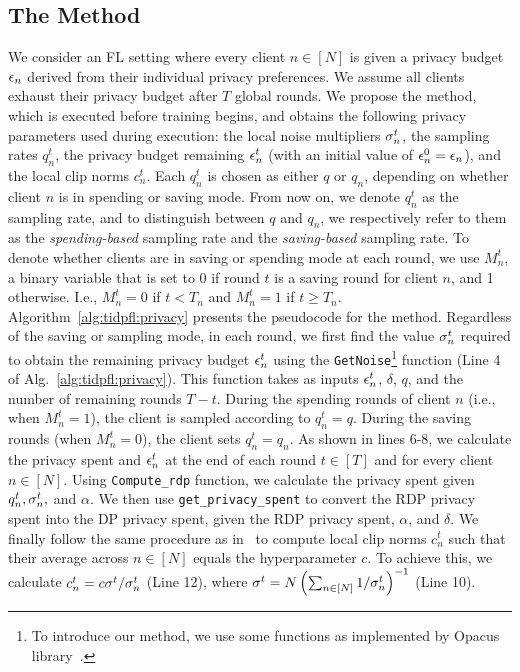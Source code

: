 \subsection{The \algasgo Method}\label{sec:proposed:alg:privacy}
{We consider an FL setting where every client $n\in [N]$ is given a privacy budget ${\epsilon}_n$ derived from their individual privacy preferences. We assume all clients exhaust their privacy budget after $T$ global rounds. We propose the \algasgo method, which is executed before training begins, and obtains the following privacy parameters used during execution: 
the local noise multipliers $\sigma_n^t$, the sampling rates $q_n^t$, the privacy budget remaining ${\epsilon}_n^t$ (with an initial value of ${\epsilon}_n^0={\epsilon}_n$), and the local clip norms $c_n^t$. Each $q_n^t$ is chosen as either $q$ or $q_n$, depending on whether client $n$ is in spending or saving mode. From now on, we denote $q_n^t$ as the sampling rate, and to distinguish between $q$ and $q_n$, we respectively refer to them as the {\em spending-based} sampling rate and the {\em saving-based} sampling rate. To denote whether clients are in saving or spending mode at each round, we use $M_n^t$, a binary variable that is set to 0 if round $t$ is a saving round for client $n$, and 1 otherwise. I.e., $M_n^t = 0$ if $t< T_n$ and $M_n^t = 1$ if $t\geq T_n$. }
{Algorithm~\ref{alg:tidpfl:privacy} presents the pseudocode for the \algasgo method.  Regardless of the saving or sampling mode, in each round, we first find the value $\sigma_n^t$ required to obtain the remaining privacy budget ${\epsilon}_n^t$ using the \texttt{GetNoise}\footnote{To introduce our \algasgo method, we use some functions as implemented by Opacus library~\citep{opacus}.} function (Line 4 of Alg.~\ref{alg:tidpfl:privacy}). This function takes as inputs ${\epsilon}_n^t$, $\delta$, $q$, and the number of remaining rounds $T-t$. During the spending rounds of client $n$ (i.e., when $M_n^t=1$), the client is sampled according to $q_n^t=q$. During the saving rounds (when $M_n^t=0$), the client sets $q_n^t=q_n$. As shown in lines 6-8, we calculate the privacy spent and ${\epsilon}_n^t$ at the end of each round $t\in [T]$ and for every client $n\in [N]$. Using  \texttt{Compute\_rdp} function, we calculate the privacy spent given $q_n^t, \sigma_n^t,$ and $\alpha$. We then use \texttt{get\_privacy\_spent} to convert the RDP privacy spent into the DP privacy spent, given the RDP privacy spent, $\alpha$, and $\delta$. We finally follow the same procedure as in~\citet{boenisch2024have} to compute local clip norms $c_n^t$ such that their average across $n\in [N]$ equals the hyperparameter $c$. To achieve this, we calculate $c_n^t={c\sigma^t}/{\sigma_n^t}$ (Line 12), where $\sigma^t = N\left(\sum_{n\in [N]}{1}/{\sigma_n^t}\right)^{-1}$ (Line 10). }

